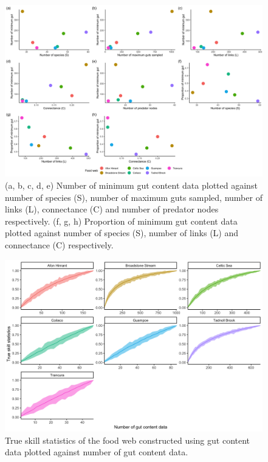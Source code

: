 \documentclass{article}
\begin{document}
\begin{figure}

{\centering \includegraphics[width=500px]{../../results/misc/plot_min_gut_vs_X} 

}

\caption{\label{fig:fig_rb} (a, b, c, d, e) Number of minimum gut content data plotted against number of species (S), number of maximum guts sampled, number of links (L), connectance (C) and number of predator nodes respectively. (f, g, h) Proportion of minimum gut content data plotted against number of species (S), number of links (L) and connectance (C) respectively.}\label{fig:unnamed-chunk-3}
\end{figure}

\begin{figure}

{\centering \includegraphics[width=500px]{../../results/misc/plot_empTSS_ngut} 

}

\caption{\label{fig:fig_rc} True skill statistics of the food web constructed using gut content data plotted against number of gut content data.}\label{fig:unnamed-chunk-4}
\end{figure}
\end{document}
